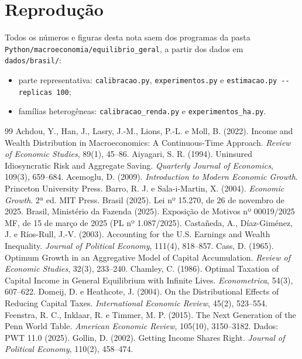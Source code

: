 \documentclass[11pt,a4paper]{article}
\begin{document}
\section*{Reprodução}
Todos os números e figuras desta nota saem dos programas da pasta
\nolinkurl{Python/macroeconomia/equilibrio_geral}, a partir dos dados em
\nolinkurl{dados/brasil/}:
\begin{itemize}
 \item parte representativa: \texttt{calibracao.py}, \texttt{experimentos.py} e
 \texttt{estimacao.py -{}-replicas 100};
 \item famílias heterogêneas: \texttt{calibracao\_renda.py} e
 \texttt{experimentos\_ha.py}.
\end{itemize}

\begin{thebibliography}{99}
\small
{} Achdou, Y., Han, J., Lasry, J.-M., Lions, P.-L. e Moll, B. (2022).
Income and Wealth Distribution in Macroeconomics: A Continuous-Time Approach.
\emph{Review of Economic Studies}, 89(1), 45--86.
 Aiyagari, S. R. (1994). Uninsured Idiosyncratic Risk and
Aggregate Saving. \emph{Quarterly Journal of Economics}, 109(3), 659--684.
 Acemoglu, D. (2009). \emph{Introduction to Modern Economic
Growth}. Princeton University Press.
 Barro, R. J. e Sala-i-Martin, X. (2004). \emph{Economic Growth}.
2ª ed. MIT Press.
 Brasil (2025). Lei nº 15.270, de 26 de novembro de 2025.
 Brasil, Ministério da Fazenda (2025). Exposição de Motivos
nº 00019/2025 MF, de 15 de março de 2025 (PL nº 1.087/2025).
 Castañeda, A., Díaz-Giménez, J. e Ríos-Rull, J.-V. (2003).
Accounting for the U.S. Earnings and Wealth Inequality. \emph{Journal of
Political Economy}, 111(4), 818--857.
 Cass, D. (1965). Optimum Growth in an Aggregative Model of Capital
Accumulation. \emph{Review of Economic Studies}, 32(3), 233--240.
 Chamley, C. (1986). Optimal Taxation of Capital Income in
General Equilibrium with Infinite Lives. \emph{Econometrica}, 54(3), 607--622.
 Domeij, D. e Heathcote, J. (2004). On the Distributional
Effects of Reducing Capital Taxes. \emph{International Economic Review}, 45(2),
523--554.
 Feenstra, R. C., Inklaar, R. e Timmer, M. P. (2015). The Next
Generation of the Penn World Table. \emph{American Economic Review}, 105(10),
3150--3182. Dados: PWT 11.0 (2025).
 Gollin, D. (2002). Getting Income Shares Right.
\emph{Journal of Political Economy}, 110(2), 458--474.

\end{thebibliography}
\end{document}
